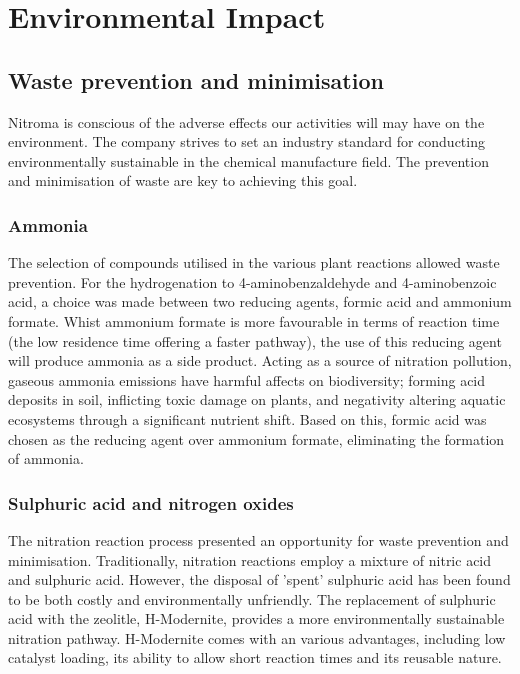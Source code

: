 \section{Environmental Impact}

\subsection{Waste prevention and minimisation}

Nitroma is conscious of the adverse effects our activities will may have on the environment. The company strives to set an industry standard for conducting environmentally sustainable in the chemical manufacture field. The prevention and minimisation of waste are key to achieving this goal. 

\subsubsection{Ammonia}
The selection of compounds utilised in the various plant reactions allowed waste prevention. For the hydrogenation to 4-aminobenzaldehyde and 4-aminobenzoic acid, a choice was made between two reducing agents, formic acid and ammonium formate. Whist ammonium formate is more favourable in terms of reaction time (the low residence time offering a faster pathway), the use of this reducing agent will produce ammonia as a side product. Acting as a  source of nitration pollution, gaseous ammonia emissions have harmful affects on biodiversity; forming acid deposits in soil, inflicting toxic damage on plants, and negativity altering aquatic ecosystems through a significant nutrient shift. Based on this, formic acid was chosen as the reducing agent over ammonium formate, eliminating the formation of ammonia. 

\subsubsection{Sulphuric acid and nitrogen oxides}
The nitration reaction process presented an opportunity for waste prevention and minimisation. Traditionally, nitration reactions employ a mixture of nitric acid and sulphuric acid. However, the disposal of 'spent' sulphuric acid has been found to be both costly and environmentally unfriendly. The replacement of sulphuric acid with the zeolitle, H-Modernite, provides a more environmentally sustainable nitration pathway. H-Modernite comes with an various advantages, including low catalyst loading, its ability to allow short reaction times and its reusable nature. 

